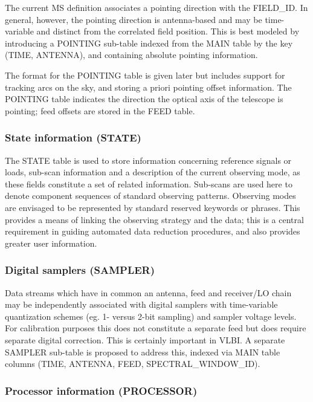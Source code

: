 \documentclass{article}
\begin{document}
The current MS definition associates a pointing direction with the
FIELD\_ID. In general, however, the pointing direction is
antenna-based and may be time-variable and distinct from the
correlated field position. This is best modeled by introducing a
POINTING sub-table indexed from the MAIN table by the key (TIME,
ANTENNA), and containing absolute pointing information.

The format for the POINTING table is given later but includes support
for tracking arcs on the sky, and storing a priori pointing offset
information. The POINTING table indicates the direction the optical
axis of the telescope is pointing; feed offsets are stored in the FEED
table.

\subsubsection{State information (STATE)}

The STATE table is used to store information concerning reference
signals or loads, sub-scan information and a description of the
current observing mode, as these fields constitute a set of related
information. Sub-scans are used here to denote component sequences of
standard observing patterns. Observing modes are envisaged to be
represented by standard reserved keywords or phrases. This provides a
means of linking the observing strategy and the data; this is a
central requirement in guiding automated data reduction procedures,
and also provides greater user information.

\subsubsection{Digital samplers (SAMPLER)}

Data streams which have in common an antenna, feed and receiver/LO
chain may be independently associated with digital samplers with
time-variable quantization schemes (eg. 1- versus 2-bit sampling) and
sampler voltage levels. For calibration purposes this does not
constitute a separate feed but does require separate digital
correction. This is certainly important in VLBI. A separate SAMPLER
sub-table is proposed to address this, indexed via MAIN
table columns (TIME, ANTENNA, FEED, SPECTRAL\_WINDOW\_ID).

\subsubsection{Processor information (PROCESSOR)}
\end{document}
